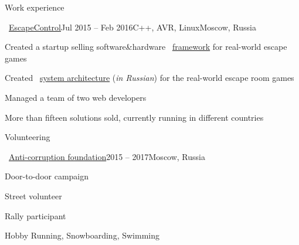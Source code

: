 \documentclass{resume} %
\begin{document}
\begin{rSection}{Work experience}

\begin{rSubsection}{\faExternalLink~\href{http://escapecontrol.ru/index_en.html}{EscapeControl}}{Jul 2015 -- Feb 2016}{C++, AVR, Linux}{Moscow, Russia}
	\item Created a startup selling software\&hardware \faExternalLink~\href{http://demo:demo@ec3.pagekite.escapecontrol.ru}{framework} for real-world escape games
	\item Created \faExternalLink~\href{http://habr.ru/p/258585/}{system architecture} ({\em in Russian}) for the real-world escape room games
	\item Managed a team of two web developers
	\item More than fifteen solutions sold, currently running in different countries
\end{rSubsection}


		
\end{rSection}

\begin{rSection}{Volunteering}
	\begin{rSubsection}{\faExternalLink~\href{https://fbk.info/english/about/}{Anti-corruption foundation}}{2015 -- 2017}{Moscow, Russia}{}
		\item Door-to-door campaign
		\item Street volunteer
		\item Rally participant
	\end{rSubsection}
\end{rSection}

\begin{rSection}{Hobby}
Running, Snowboarding, Swimming
\end{rSection}
\end{document}
